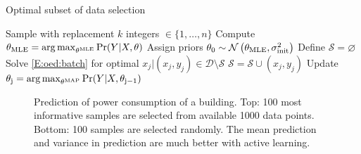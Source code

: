 \begin{algorithm}[!tb]
	\caption{Optimal subset of data selection}
	\label{A:oed:batch}
	\begin{algorithmic}[1]
		\State Sample with replacement \(k\) integers \( \in \{1,\dots,n\} \)
		\State Compute \( \theta_{\mathrm{MLE}} = \operatorname*{arg\,max}_{\theta^{\mathrm{MLE}}} \Pr(Y \vert X, \theta)\)
		\State Assign priors \(\theta_{\mathrm{0}} \sim \operatorname*{\mathcal{N}}\left(\theta_{\mathrm{MLE}}, \sigma^2_{\mathrm{init}}\right)\)
		\EndProcedure
		\State Define \(\mathcal{S} = \varnothing\)
		\State Solve \eqref{E:oed:batch} for optimal \({x_{j} \vert (x_j,y_j) \in \mathcal{D} \setminus \mathcal{S}} \)
		\State \(\mathcal{S} = \mathcal{S} \cup (x_j,y_j) \)
		\State Update \( \theta_{\mathrm{j}} = \operatorname*{arg\,max}_{\theta^{\mathrm{MAP}}} \Pr(Y \vert X, \theta_{\mathrm{j-1}})\)
		\EndWhile
		\EndProcedure
	\end{algorithmic}
\end{algorithm}

\begin{figure}[!tb]
	\centering
	\setlength{}
	\setlength{}	
	
	\caption{Prediction of power consumption of a building. Top: 100 most informative samples are selected from available 1000 data points. Bottom: 100 samples are selected randomly. The mean prediction and variance in prediction are much better with active learning.}
	\captionsetup{justification=centering}
	\label{F:batch-acc}
\end{figure}
